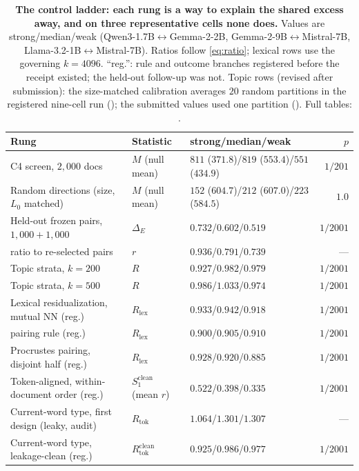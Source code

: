 \begin{table}[t]
\centering
\caption{\textbf{The control ladder: each rung is a way to explain the shared excess away, and on
three representative cells none does.} Values are
strong/median/weak (Qwen3-1.7B$\leftrightarrow$Gemma-\mbox{2-2B}, Gemma-2-9B$\leftrightarrow$Mistral-7B,
Llama-3.2-1B$\leftrightarrow$Mistral-7B). Ratios follow \eqref{eq:ratio}; lexical rows use the
governing $k{=}4096$. ``reg.'': rule and outcome branches registered before the receipt existed;
the held-out follow-up was not. Topic rows (revised after submission): the size-matched
calibration averages $20$ random partitions in the registered nine-cell run ();
the submitted values used one partition (). Full tables: .}
\label{tab:ladder}
\footnotesize
\setlength{\tabcolsep}{3pt}
\begin{tabular}{@{}lllr@{}}
\toprule
Rung & Statistic & strong/median/weak & $p$ \\
\midrule
C4 screen, $2{,}000$ docs & $M$ (null mean) & $811$ ($371.8$)/$819$ ($553.4$)/$551$ ($434.9$) & $1/201$ \\
Random directions (size, $L_0$ matched) & $M$ (null mean) & $152$ ($604.7$)/$212$ ($607.0$)/$223$ ($584.5$) & $1.0$ \\
Held-out frozen pairs, $1{,}000{+}1{,}000$ & $\Delta_E$ & $0.732$/$0.602$/$0.519$ & $1/2001$ \\
\quad ratio to re-selected pairs & $r$ & $0.936$/$0.791$/$0.739$ & --- \\
\midrule
Topic strata, $k{=}200$ & $R$ & $0.927$/$0.982$/$0.979$ & $1/2001$ \\
Topic strata, $k{=}500$ & $R$ & $0.986$/$1.033$/$0.974$ & $1/2001$ \\
Lexical residualization, mutual NN (reg.) & $R_{\text{lex}}$ & $0.933$/$0.942$/$0.918$ & $1/2001$ \\
\quad \citeauthor{lan2024universal} pairing rule (reg.) & $R_{\text{lex}}$ & $0.900$/$0.905$/$0.910$ & $1/2001$ \\
\quad Procrustes pairing, disjoint half (reg.) & $R_{\text{lex}}$ & $0.928$/$0.920$/$0.885$ & $1/2001$ \\
\midrule
Token-aligned, within-document order (reg.) & $S_1^{\text{clean}}$ (mean $r$) & $0.522$/$0.398$/$0.335$ & $1/2001$ \\
Current-word type, first design (leaky, audit) & $R_{\text{tok}}$ & $1.064$/$1.301$/$1.307$ & --- \\
Current-word type, leakage-clean (reg.) & $R_{\text{tok}}^{\text{clean}}$ & $0.925$/$0.986$/$0.977$ & $1/2001$ \\
\bottomrule
\end{tabular}
\end{table}

